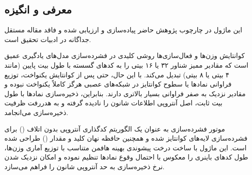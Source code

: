 \subsection{معرفی و انگیزه}
این ماژول در چارچوب پژوهش حاضر پیاده‌سازی و ارزیابی شده و فاقد مقاله مستقل جداگانه در ادبیات تحقیق است.

کوانتایش وزن‌ها و فعال‌سازی‌ها روشی کلیدی در فشرده‌سازی مدل‌های یادگیری عمیق است که مقادیر ممیز شناور ۳۲ یا ۱۶ بیتی را به کدهای گسسته با طول بیت پایین (مانند ۴ بیتی یا ۸ بیتی) تبدیل می‌کند. با این حال، حتی پس از کوانتایش یکنواخت، توزیع فراوانی نمادها یا سطوح کوانتایز در شبکه‌های عصبی هرگز کاملاً یکنواخت نبوده و مقادیر نزدیک به صفر فراوانی بسیار بالاتری دارند. بنابراین، ذخیره‌سازی نمادها با طول بیت ثابت، اصل آنتروپی اطلاعات شانون را نادیده گرفته و به هدررفت ظرفیت ذخیره‌سازی می‌انجامد.

موتور فشرده‌سازی  به عنوان یک الگوریتم کدگذاری آنتروپی بدون اتلاف () برای فشرده‌سازی لایه‌های کوانتایز شده و همچنین حافظه نهان کلید و مقدار () طراحی شده است. این ماژول با ساخت درخت پیشوندی بهینه هافمن متناسب با توزیع آماری وزن‌ها، طول کدهای باینری را معکوس با احتمال وقوع نمادها تنظیم نموده و امکان نزدیک شدن نرخ ذخیره‌سازی به حد آنتروپی شانون را فراهم می‌سازد.

